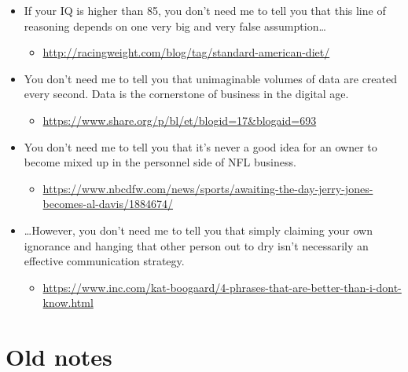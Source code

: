 \documentclass[10pt]{article}
\begin{document}
\begin{itemize}
\item If your IQ is higher than 85, you don’t need me to tell you that this line of reasoning depends on one very big and very false assumption\dots
  \begin{itemize}
  \item \url{http://racingweight.com/blog/tag/standard-american-diet/}
  \end{itemize}
\item You don’t need me to tell you that unimaginable volumes of data are created every second. Data is the cornerstone of business in the digital age.
  \begin{itemize}
  \item \url{https://www.share.org/p/bl/et/blogid=17&blogaid=693}
  \end{itemize}
\item You don’t need me to tell you that it’s never a good idea for an owner to become mixed up in the personnel side of NFL business.
  \begin{itemize}
  \item \url{https://www.nbcdfw.com/news/sports/awaiting-the-day-jerry-jones-becomes-al-davis/1884674/}
  \end{itemize}
\item \dots However, you don't need me to tell you that simply claiming your own ignorance and hanging that other person out to dry isn't necessarily an effective communication strategy.
  \begin{itemize}
  \item \url{https://www.inc.com/kat-boogaard/4-phrases-that-are-better-than-i-dont-know.html}
  \end{itemize}
\end{itemize}


\newpage

\printbibliography


\newpage

\section*{Old notes}
\label{sec:old-notes}
\end{document}
